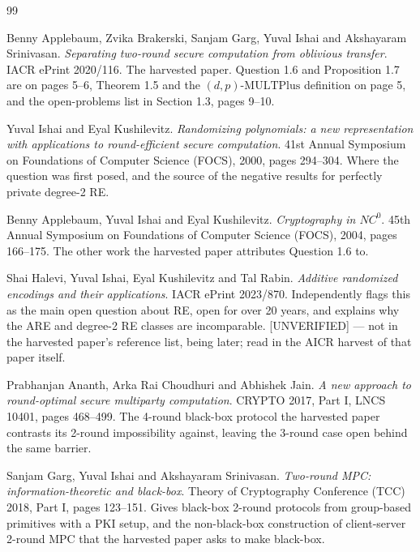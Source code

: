 \documentclass{aicr-conjecture}
\newcommand{\MULT}{\mathrm{MULTPlus}}
\begin{document}
\begin{aicrbibliography}{99}

Benny Applebaum, Zvika Brakerski, Sanjam Garg, Yuval Ishai and
Akshayaram Srinivasan.
\emph{Separating two-round secure computation from oblivious transfer}.
IACR ePrint 2020/116.
The harvested paper. Question 1.6 and Proposition 1.7 are on pages 5--6,
Theorem 1.5 and the $(d,p)\text{-}\MULT$ definition on page 5, and the
open-problems list in Section 1.3, pages 9--10.

Yuval Ishai and Eyal Kushilevitz.
\emph{Randomizing polynomials: a new representation with applications to
round-efficient secure computation}.
41st Annual Symposium on Foundations of Computer Science (FOCS), 2000,
pages 294--304.
Where the question was first posed, and the source of the negative
results for perfectly private degree-2 RE\@.

Benny Applebaum, Yuval Ishai and Eyal Kushilevitz.
\emph{Cryptography in $NC^{0}$}.
45th Annual Symposium on Foundations of Computer Science (FOCS), 2004,
pages 166--175.
The other work the harvested paper attributes Question 1.6 to.

Shai Halevi, Yuval Ishai, Eyal Kushilevitz and Tal Rabin.
\emph{Additive randomized encodings and their applications}.
IACR ePrint 2023/870.
Independently flags this as the main open question about RE, open for over
20 years, and explains why the ARE and degree-2 RE classes are
incomparable. [UNVERIFIED] --- not in the harvested paper's reference list,
being later; read in the AICR harvest of that paper itself.

Prabhanjan Ananth, Arka Rai Choudhuri and Abhishek Jain.
\emph{A new approach to round-optimal secure multiparty computation}.
CRYPTO 2017, Part I, LNCS 10401, pages 468--499.
The 4-round black-box protocol the harvested paper contrasts its 2-round
impossibility against, leaving the 3-round case open behind the same
barrier.

Sanjam Garg, Yuval Ishai and Akshayaram Srinivasan.
\emph{Two-round MPC: information-theoretic and black-box}.
Theory of Cryptography Conference (TCC) 2018, Part I, pages 123--151.
Gives black-box 2-round protocols from group-based primitives with a PKI
setup, and the non-black-box construction of client-server 2-round MPC
that the harvested paper asks to make black-box.

\end{aicrbibliography}
\end{document}
